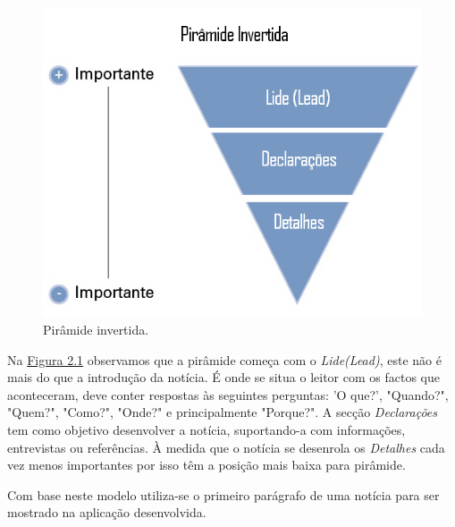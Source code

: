 \vspace{0,07cm}
\begin{figure}[H]
\centering
\includegraphics[scale=0.5]{relatorio-projeto/imagens/piramide_invertida.png}
\caption{Pirâmide invertida.}
\label{fig:pirâmide}
\end{figure}
 
 Na \hyperref[fig:pirâmide]{Figura 2.1} observamos que a pirâmide começa com o \emph{Lide(Lead)}, este não é mais do que a introdução da notícia. É onde se situa o leitor com os factos que aconteceram, deve conter respostas às seguintes perguntas: 'O que?', "Quando?", "Quem?", "Como?", "Onde?" e principalmente "Porque?".
 A secção \emph{Declarações} tem como objetivo desenvolver a notícia, suportando-a com informações, entrevistas ou referências.
 À medida que o notícia se desenrola os \emph{Detalhes} cada vez menos importantes por isso têm a posição mais baixa para pirâmide.
 \par
Com base neste modelo utiliza-se o primeiro parágrafo de uma notícia para ser mostrado na aplicação desenvolvida.
 
